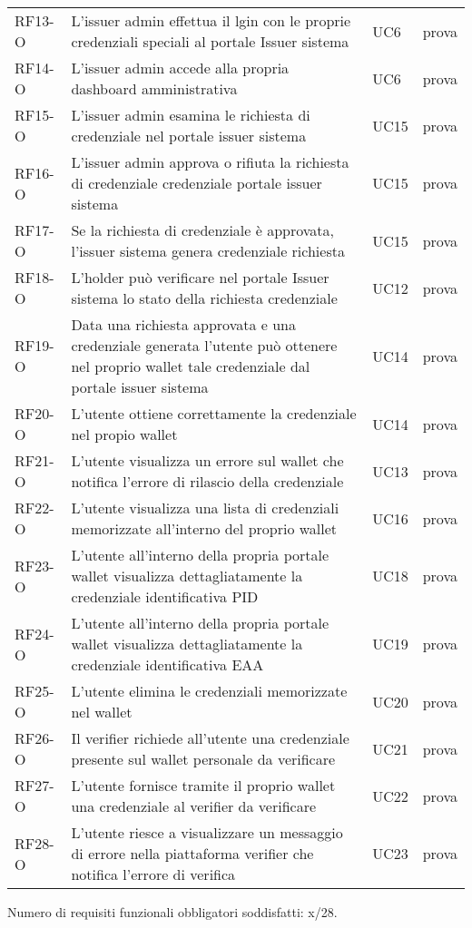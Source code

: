 \begin{longtable}{|p{}|p{}|p{}|p{}|}
        RF13-O & L'issuer admin effettua il lgin con le proprie credenziali speciali al portale Issuer sistema & UC6& prova\\ 
        RF14-O & L'issuer admin accede alla propria dashboard amministrativa & UC6& prova\\
        RF15-O & L'issuer admin esamina le richiesta di credenziale nel portale issuer sistema  & UC15& prova\\
        RF16-O & L'issuer admin approva o rifiuta la richiesta di credenziale credenziale portale issuer sistema & UC15& prova\\
        RF17-O & Se la richiesta di credenziale  è approvata, l'issuer sistema genera credenziale richiesta & UC15& prova\\
        RF18-O & L'holder può verificare nel portale Issuer sistema lo stato della richiesta credenziale & UC12& prova\\ 
        RF19-O & Data una richiesta approvata e una credenziale generata l'utente può ottenere nel proprio wallet tale credenziale dal portale issuer sistema & UC14 & prova\\
        RF20-O & L'utente ottiene correttamente la credenziale nel propio wallet & UC14& prova\\
        RF21-O & L'utente visualizza un errore sul wallet che notifica l'errore di rilascio della credenziale & UC13& prova\\
        RF22-O & L'utente visualizza una lista di credenziali memorizzate all'interno del proprio wallet& UC16& prova\\
        RF23-O & L'utente all'interno della propria portale wallet visualizza dettagliatamente la credenziale identificativa PID & UC18& prova\\
        RF24-O & L'utente all'interno della propria portale wallet visualizza dettagliatamente la credenziale identificativa EAA & UC19& prova\\
        RF25-O & L'utente elimina le credenziali memorizzate nel wallet & UC20& prova\\
        RF26-O & Il verifier richiede all'utente una credenziale presente sul wallet personale da verificare & UC21& prova\\
        RF27-O & L'utente fornisce tramite il proprio wallet una credenziale al verifier da verificare & UC22& prova\\
        RF28-O & L'utente riesce a visualizzare un messaggio di errore nella piattaforma verifier che notifica l'errore di verifica & UC23& prova\\
        \hline
    \end{longtable}

Numero di requisiti funzionali obbligatori soddisfatti: x/28.    